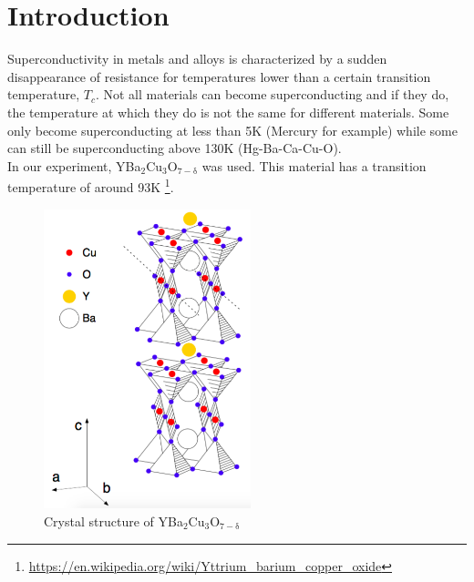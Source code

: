 \documentclass[a4paper,parskip,11pt, DIV12]{scrreprt}
\begin{document}
\fancyfoot{}
\fancyfoot[R]{\small \thepage}
\fancyfoot[L]{}
\fancyfoot[C]{}
\renewcommand{\footrulewidth}{0.4pt} 

\addtolength{\headheight}{2\baselineskip}
\addtolength{\headheight}{0.6pt}


\renewcommand{\headrulewidth}{0.6pt}
\renewcommand{\footrulewidth}{0.4pt}

\renewcommand{\chaptermark}[1]{ \markboth{#1}{} } %


\tableofcontents





\chapter{Introduction}
Superconductivity in metals and alloys is characterized by a sudden disappearance of resistance for temperatures lower than a certain transition temperature, $T_c$. Not all materials can become superconducting and if they do, the temperature at which they do is not the same for different materials. Some only become superconducting at less than 5K (Mercury for example) while some can still be superconducting above 130K (Hg-Ba-Ca-Cu-O). \\
In our experiment, YBa$_2$Cu$_3$O$_{7-\mathrm{\delta}}$ was used. This material has a transition temperature of around 93K \footnote{\url{https://en.wikipedia.org/wiki/Yttrium_barium_copper_oxide}}.

\begin{figure}[H]
\centering
\includegraphics[width=6cm]{supercond.png}
\caption{Crystal structure of YBa$_2$Cu$_3$O$_{7-\mathrm{\delta}}$}
\end{figure}
\end{document}
